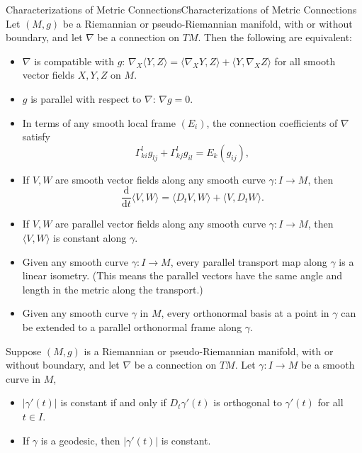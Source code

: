 \documentclass[../main.tex]{subfiles}
\begin{document}
\begin{proposition}{Characterizations of Metric Connections}{Characterizations of Metric Connections}
	Let $(M, g)$ be a Riemannian or pseudo-Riemannian manifold, with or without boundary, and let $\nabla$ be a connection on $TM$. Then the following are equivalent:
	\begin{itemize}
		\item $\nabla$ is compatible with $g$: $\nabla_X \langle Y, Z \rangle = \langle \nabla_X Y, Z \rangle + \langle Y, \nabla_X Z \rangle$ for all smooth vector fields $X, Y, Z$ on $M$.
		\item $g$ is parallel with respect to $\nabla$: $\nabla g = 0$.
		\item In terms of any smooth local frame $(E_i)$, the connection coefficients of $\nabla$ satisfy
		      \begin{equation}
			      \Gamma_{ki}^l g_{lj} + \Gamma_{kj}^l g_{il} = E_k(g_{ij}),
		      \end{equation}
		\item If $V,W$ are smooth vector fields along any smooth curve $\gamma: I \to M$, then
		      \begin{equation}
			      \frac{\mathrm{d}}{\mathrm{d}t} \langle V, W \rangle = \langle D_t V, W \rangle + \langle V, D_t W \rangle.
		      \end{equation}
		\item If $V,W$ are parallel vector fields along any smooth curve $\gamma: I \to M$, then $\langle V, W \rangle$ is constant along $\gamma$.
		\item Given any smooth curve $\gamma: I \to M$, every parallel transport map along $\gamma$ is a linear isometry. (This means the parallel vectors have the same angle and length in the metric along the transport.)
		\item Given any smooth curve $\gamma$ in $M$, every orthonormal basis at a point in $\gamma$ can be extended to a parallel orthonormal frame along $\gamma$.
	\end{itemize}
\end{proposition}

\begin{proposition}{}{}
	Suppose $(M, g)$ is a Riemannian or pseudo-Riemannian manifold, with or without boundary, and let $\nabla$ be a connection on $TM$. Let $\gamma: I \to M$ be a smooth curve in $M$,
	\begin{itemize}
		\item $|\gamma'(t)|$ is constant if and only if $D_t \gamma'(t)$ is orthogonal to $\gamma'(t)$ for all $t \in I$.
		\item If $\gamma$ is a geodesic, then $|\gamma'(t)|$ is constant.
	\end{itemize}
\end{proposition}
\end{document}
